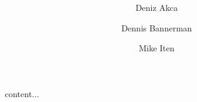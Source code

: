 \documentclass[a4paper]{article}
\author{
	Deniz Akca
	\and
	Dennis Bannerman
	\and
	Mike Iten
}
\affil{ZHAW - Zurich}
\title{
	\Huge{}\color{blue}\textbf{\project}\\ 
	\vspace{2cm}
	\large{}\color{black}\textbf{\outline}
}
\begin{document}
	\sloppy
	
	\begin{titlepage}
		\maketitle
		\thispagestyle{empty}
	\end{titlepage}
	
	\tableofcontents
	\newpage
	
	\fussy
	
	content...
\end{document}

